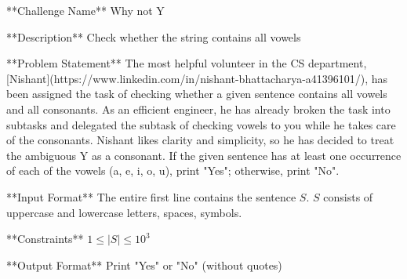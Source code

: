 **Challenge Name**  
Why not Y

**Description**  
Check whether the string contains all vowels

**Problem Statement**  
The most helpful volunteer in the CS department, [Nishant](https://www.linkedin.com/in/nishant-bhattacharya-a41396101/), has been assigned the task of checking whether a given sentence contains all vowels and all consonants. As an efficient engineer, he has already broken the task into subtasks and delegated the subtask of checking vowels to you while he takes care of the consonants. Nishant likes clarity and simplicity, so he has decided to treat the ambiguous Y as a consonant. If the given sentence has at least one occurrence of each of the vowels (a, e, i, o, u), print "Yes"; otherwise, print "No".

**Input Format**  
The entire first line contains the sentence $S$.  
$S$ consists of uppercase and lowercase letters, spaces, symbols.

**Constraints**  
$1 \leq |S| \leq 10^3$ 

**Output Format**  
Print "Yes" or "No" (without quotes)